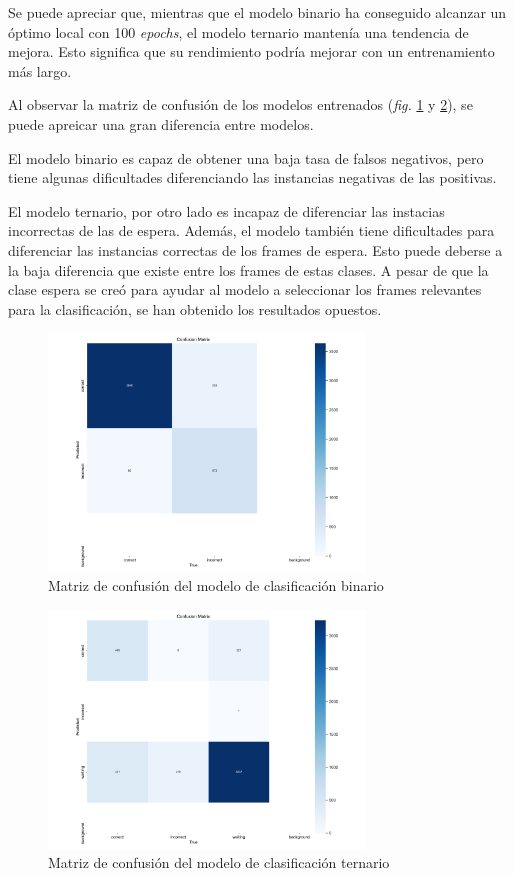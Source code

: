 \documentclass[12pt]{report} %
\begin{document}
    Se puede apreciar que, mientras que el modelo binario ha conseguido
    alcanzar un óptimo local con 100 \textit{epochs}, el modelo ternario
    mantenía una tendencia de mejora. Esto significa que su rendimiento podría
    mejorar con un entrenamiento más largo.

    Al observar la matriz de confusión de los modelos entrenados (\textit{fig.} \ref{mc1} y \ref{mc2}), se puede
    apreicar una gran diferencia entre modelos.

    El modelo binario es capaz de obtener una baja tasa de falsos negativos,
    pero tiene algunas dificultades diferenciando las instancias negativas de
    las positivas.

    El modelo ternario, por otro lado es incapaz de diferenciar las instacias
    incorrectas de las de espera.  Además, el modelo también tiene dificultades
    para diferenciar las instancias correctas de los frames de espera. Esto
    puede deberse a la baja diferencia que existe entre los frames de estas
    clases. A pesar de que la clase espera se creó para ayudar al modelo a
    seleccionar los frames relevantes para la clasificación, se han obtenido
    los resultados opuestos.

    \begin{figure}[H]
    \includegraphics[width=0.75\textwidth]{confusion_matrix2.png}
    \caption  {Matriz de confusión del modelo de clasificación binario}
    \label{mc1}
    \end{figure}
    \begin{figure}[H]
    \includegraphics[width=0.75\textwidth]{confusion_matrix3.png}
    \caption  {Matriz de confusión del modelo de clasificación ternario}
    \label{mc2}
    \end{figure}
\end{document}
